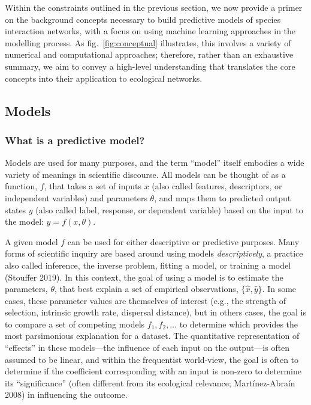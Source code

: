 \documentclass[10pt,oneside]{article}
\begin{document}
Within the constraints outlined in the previous section, we now provide
a primer on the background concepts necessary to build predictive models
of species interaction networks, with a focus on using machine learning
approaches in the modelling process. As fig.~\ref{fig:conceptual}
illustrates, this involves a variety of numerical and computational
approaches; therefore, rather than an exhaustive summary, we aim to
convey a high-level understanding that translates the core concepts into
their application to ecological networks.

\hypertarget{models}{%
\subsection{Models}\label{models}}

\hypertarget{what-is-a-predictive-model}{%
\subsubsection{What is a predictive
model?}\label{what-is-a-predictive-model}}

Models are used for many purposes, and the term ``model'' itself
embodies a wide variety of meanings in scientific discourse. All models
can be thought of as a function, \(f\), that takes a set of inputs \(x\)
(also called features, descriptors, or independent variables) and
parameters \(\theta\), and maps them to predicted output states \(y\)
(also called label, response, or dependent variable) based on the input
to the model: \(y=f(x,\theta)\).

A given model \(f\) can be used for either descriptive or predictive
purposes. Many forms of scientific inquiry are based around using models
\emph{descriptively}, a practice also called inference, the inverse
problem, fitting a model, or training a model (Stouffer 2019). In this
context, the goal of using a model is to estimate the parameters,
\(\theta\), that best explain a set of empirical observations,
\(\{\hat{x}, \hat{y}\}\). In some cases, these parameter values are
themselves of interest (e.g., the strength of selection, intrinsic
growth rate, dispersal distance), but in others cases, the goal is to
compare a set of competing models \(f_1, f_2, \dots\) to determine which
provides the most parsimonious explanation for a dataset. The
quantitative representation of ``effects'' in these models---the
influence of each input on the output---is often assumed to be linear,
and within the frequentist world-view, the goal is often to determine if
the coefficient corresponding with an input is non-zero to determine its
``significance'' (often different from its ecological relevance;
Martínez-Abraín 2008) in influencing the outcome.
\end{document}

